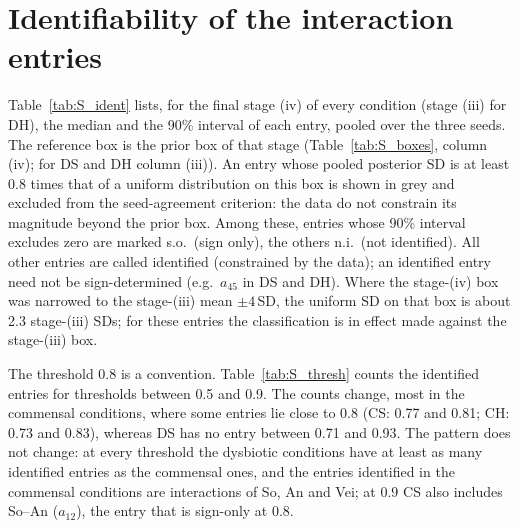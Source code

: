 \documentclass[11pt,a4paper]{article}
\newcommand{\suppdir}{figures/raw/supp}%
\begin{document}
\begin{table}[h]
\centering
\caption{Runs of the final pipeline (three seeds per row): particles $N_p$, mutation steps per tempering step $n_{\mathrm{mut}}$, tempering steps $K$, acceptance rate, moves per free parameter (criterion (c)), maximum log-likelihood (best seed, after local optimisation from the best particles where this was done; spread over the three seeds in parentheses, criterion (d)), largest spread of the seed medians over the identified entries in units of the pooled posterior SD (criterion (e), no mode splitting) and wall-clock hours per seed. DH: the final stage is (iii); stage (iv) fails (e) and is listed for completeness.}
\label{tab:S_runs}
\footnotesize\setlength{\tabcolsep}{4pt}
\end{table}

\section{Identifiability of the interaction entries}
\label{sec:S_ident}
Table~\ref{tab:S_ident} lists, for the final stage (iv) of every condition (stage (iii) for DH), the median and the 90\% interval of each entry, pooled over the three seeds.
The reference box is the prior box of that stage (Table~\ref{tab:S_boxes}, column (iv); for DS and DH column (iii)).
An entry whose pooled posterior SD is at least 0.8 times that of a uniform distribution on this box is shown in grey and excluded from the seed-agreement criterion: the data do not constrain its magnitude beyond the prior box. Among these, entries whose 90\% interval excludes zero are marked s.o.\ (sign only), the others n.i.\ (not identified). All other entries are called identified (constrained by the data); an identified entry need not be sign-determined (e.g.\ $a_{45}$ in DS and DH).
Where the stage-(iv) box was narrowed to the stage-(iii) mean $\pm4$\,SD, the uniform SD on that box is about 2.3 stage-(iii) SDs; for these entries the classification is in effect made against the stage-(iii) box.

The threshold 0.8 is a convention. Table~\ref{tab:S_thresh} counts the identified entries for thresholds between 0.5 and 0.9.
The counts change, most in the commensal conditions, where some entries lie close to 0.8 (CS: 0.77 and 0.81; CH: 0.73 and 0.83), whereas DS has no entry between 0.71 and 0.93.
The pattern does not change: at every threshold the dysbiotic conditions have at least as many identified entries as the commensal ones, and the entries identified in the commensal conditions are interactions of So, An and Vei; at 0.9 CS also includes So--An ($a_{12}$), the entry that is sign-only at 0.8.
\end{document}
